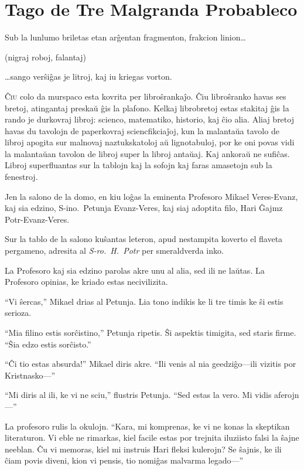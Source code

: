 \chapter{Tago de Tre Malgranda Probableco}

\begin{chapterOpeningQuote}
\noindent
Sub la lunlumo briletas etan arĝentan fragmenton, frakcion linion…

\vspace*{2ex}
(nigraj roboj, falantaj)

\vspace*{2ex}
…sango verŝiĝas je litroj, kaj iu kriegas vorton.
\end{chapterOpeningQuote}

\lettrine{Ĉ}{iu} colo da murspaco esta kovrita per libroŝrankaĵo. Ĉiu libroŝranko havas ses bretoj, atingantaj preskaŭ ĝis la plafono. Kelkaj librobretoj estas stakitaj ĝis la rando je durkovraj libroj: scienco, matematiko, historio, kaj ĉio alia. Aliaj bretoj havas du tavolojn de paperkovraj sciencfikciaĵoj, kun la malantaŭa tavolo de libroj apogita sur malnovaj naztukskatoloj aŭ lignotabuloj, por ke oni povas vidi la malantaŭan tavolon de libroj super la libroj antaŭaj. Kaj ankoraŭ ne sufiĉas. Libroj superfluantas sur la tablojn kaj la sofojn kaj faras amasetojn sub la fenestroj.

Jen la salono de la domo, en kiu loĝas la eminenta Profesoro Mikael Veres\nobreakdash-Evanz, kaj sia edzino, S\nobreakdash-ino.~Petunja Evanz\nobreakdash-Veres, kaj siaj adoptita filo, Hari Ĝajmz Potr-Evanz-Veres.

Sur la tablo de la salono kuŝantas leteron, apud nestampita koverto el flaveta pergameno, adresita al \emph{S\nobreakdash-ro.~H.~Potr} per smeraldverda inko.

La Profesoro kaj sia edzino parolas akre unu al alia, sed ili ne laŭtas. La Profesoro opinias, ke kriado estas necivilizita.

“Vi ŝercas,” Mikael drias al Petunja. Lia tono indikis ke li tre timis ke ŝi estis serioza.

“Mia filino estis sorĉistino,” Petunja ripetis. Ŝi aspektis timigita, sed staris firme. “Ŝia edzo estis sorĉisto.”

“Ĉi tio estas absurda!” Mikael diris akre. “Ili venis al nia geedziĝo—ili vizitis por Kristnasko—”

“Mi diris al ili, ke vi ne sciu,” flustris Petunja. “Sed estas la vero. Mi vidis aferojn—”

La profesoro rulis la okulojn. “Kara, mi komprenas, ke vi ne konas la skeptikan literaturon. Vi eble ne rimarkas, kiel facile estas por trejnita iluziisto falsi la ŝajne neeblan. Ĉu vi memoras, kiel mi instruis Hari fleksi kulerojn? Se ŝajnis, ke ili ĉiam povis diveni, kion vi pensis, tio nomiĝas malvarma legado—”

